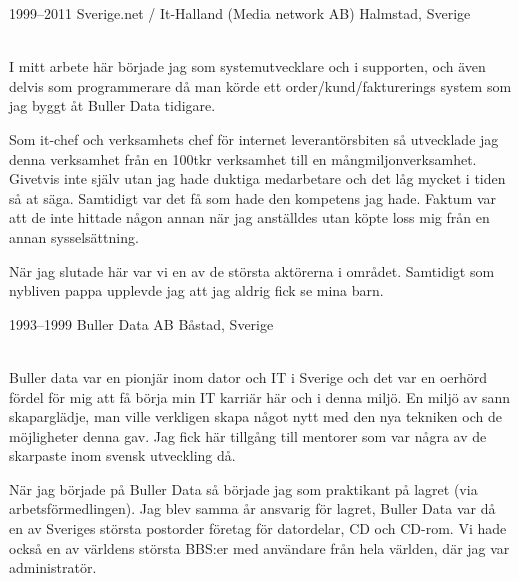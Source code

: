 \documentclass[]{cv-style}          %
\begin{document}
\begin{entrylist}
{%
}   
\entry
  {1999--2011}
  {Sverige.net / It-Halland (Media network AB)}
  {Halmstad, Sverige}
  {\\
    I mitt arbete här började jag som systemutvecklare och i supporten, och även delvis
    som programmerare då man körde ett order/kund/fakturerings system som jag byggt 
    åt Buller Data tidigare.

    Som it-chef och verksamhets chef för internet leverantörsbiten så utvecklade
    jag denna verksamhet från en 100tkr verksamhet till en mångmiljonverksamhet.
    Givetvis inte själv utan jag hade duktiga medarbetare och det låg mycket i
    tiden så at säga. Samtidigt var det få som hade den kompetens jag hade.
    Faktum var att de inte hittade någon annan när jag anställdes utan köpte
    loss mig från en annan sysselsättning.

    När jag slutade här var vi en av de största aktörerna i området. Samtidigt
    som nybliven pappa upplevde jag att jag aldrig fick se mina barn.

} 
\entry
  {1993--1999}
  {Buller Data AB}
  {Båstad, Sverige}
  {\\
    Buller data var en pionjär inom dator och IT i Sverige och det var en
    oerhörd fördel för mig att få börja min IT karriär här och i denna 
    miljö. En miljö av sann skaparglädje, man ville verkligen skapa något
    nytt med den nya tekniken och de möjligheter denna gav. Jag fick här
    tillgång till mentorer som var några av de skarpaste inom svensk utveckling
    då. 

    När jag började på Buller Data så började jag som praktikant på lagret (via 
    arbetsförmedlingen). Jag blev samma år ansvarig för lagret, Buller Data var
    då en av Sveriges största postorder företag för datordelar, CD och CD-rom.
    Vi hade också en av världens största BBS:er med användare från hela världen,
    där jag var administratör.

}
\end{entrylist}
\end{document}
